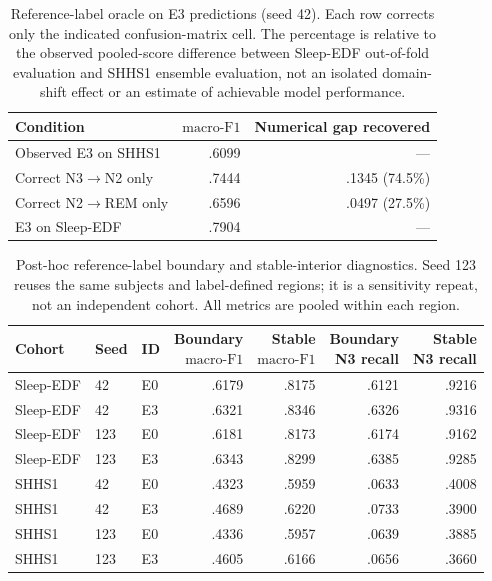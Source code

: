 \documentclass[10pt,a4paper]{article}
\newcommand{\mf}{\ensuremath{\mathrm{macro\text{-}F1}}}
\begin{document}
\begin{table}[H]
\centering\small
\caption{Reference-label oracle on E3 predictions (seed 42). Each row corrects only the indicated
confusion-matrix cell. The percentage is relative to the observed pooled-score difference between
Sleep-EDF out-of-fold evaluation and SHHS1 ensemble evaluation, not an isolated domain-shift effect
or an estimate of achievable model performance.}
\label{tab:sup_oracle}
\begin{tabular}{lrr}
\toprule
Condition & \mf & Numerical gap recovered \\
\midrule
Observed E3 on SHHS1 & .6099 & --- \\
Correct N3$\rightarrow$N2 only & .7444 & .1345 (74.5\%) \\
Correct N2$\rightarrow$REM only & .6596 & .0497 (27.5\%) \\
E3 on Sleep-EDF & .7904 & --- \\
\bottomrule
\end{tabular}
\end{table}

\begin{table}[H]
\centering\small
\caption{Post-hoc reference-label boundary and stable-interior diagnostics.
Seed 123 reuses the same subjects and label-defined regions; it is a sensitivity repeat, not
an independent cohort. All metrics are pooled within each region.}
\label{tab:sup_boundary}
\begin{tabular}{lllrrrr}
\toprule
Cohort & Seed & ID & \shortstack{Boundary\\\mf} & \shortstack{Stable\\\mf} &
\shortstack{Boundary\\N3 recall} & \shortstack{Stable\\N3 recall} \\
\midrule
Sleep-EDF & 42 & E0 & .6179 & .8175 & .6121 & .9216 \\
Sleep-EDF & 42 & E3 & .6321 & .8346 & .6326 & .9316 \\
Sleep-EDF & 123 & E0 & .6181 & .8173 & .6174 & .9162 \\
Sleep-EDF & 123 & E3 & .6343 & .8299 & .6385 & .9285 \\
\addlinespace
SHHS1 & 42 & E0 & .4323 & .5959 & .0633 & .4008 \\
SHHS1 & 42 & E3 & .4689 & .6220 & .0733 & .3900 \\
SHHS1 & 123 & E0 & .4336 & .5957 & .0639 & .3885 \\
SHHS1 & 123 & E3 & .4605 & .6166 & .0656 & .3660 \\
\bottomrule
\end{tabular}
\end{table}
\end{document}
